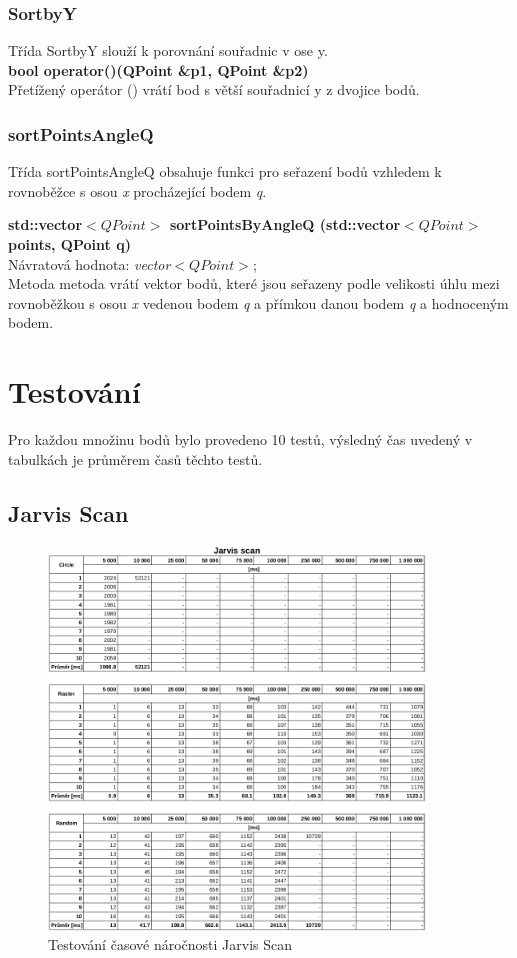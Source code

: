 \documentclass[a4paper, 12pt]{article}
\begin{document}
\subsubsection{SortbyY}
Třída SortbyY slouží k porovnání souřadnic v ose y.
\\

\textbf{bool operator()(QPoint \&p1, QPoint \&p2)}\\
Přetížený operátor () vrátí bod s větší souřadnicí y z dvojice bodů.
\\

\subsubsection{sortPointsAngleQ}
Třída sortPointsAngleQ obsahuje funkci pro seřazení bodů vzhledem k rovnoběžce s osou \textit{x} procházející bodem \textit{q}.

\textbf{std::vector$<QPoint>$ sortPointsByAngleQ (std::vector$<QPoint>$ points, QPoint q)}\\
Návratová hodnota: \textit{vector$<QPoint>$};\\
Metoda metoda vrátí vektor bodů, které jsou seřazeny podle velikosti úhlu mezi rovnoběžkou s osou \textit{x} vedenou bodem \textit{q} a přímkou danou bodem \textit{q} a hodnoceným bodem.

\newpage
\section{Testování}
Pro každou množinu bodů bylo provedeno 10 testů, výsledný čas uvedený v tabulkách je průměrem časů těchto testů.

\subsection{Jarvis Scan}

\begin{figure}[h!]
	\centering
	\includegraphics[width=10cm]{data_jarvis_scan.png}
	\caption{Testování časové náročnosti Jarvis Scan}
\end{figure}
\end{document}
